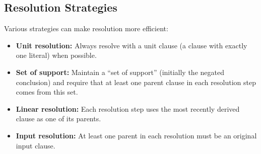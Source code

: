 \subsection{Resolution Strategies}

\begin{remark}
Various strategies can make resolution more efficient:

\begin{itemize}
  \item \textbf{Unit resolution:} Always resolve with a unit clause (a clause
        with exactly one literal) when possible.

  \item \textbf{Set of support:} Maintain a ``set of support'' (initially the
        negated conclusion) and require that at least one parent clause in each
        resolution step comes from this set.

  \item \textbf{Linear resolution:} Each resolution step uses the most recently
        derived clause as one of its parents.

  \item \textbf{Input resolution:} At least one parent in each resolution must
        be an original input clause.
\end{itemize}
\end{remark}

